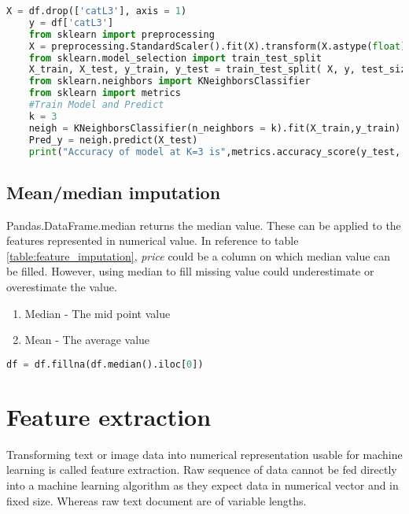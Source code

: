 \begin{lstlisting}[language=Python]
    X = df.drop(['catL3'], axis = 1)
    y = df['catL3']
    from sklearn import preprocessing
    X = preprocessing.StandardScaler().fit(X).transform(X.astype(float))
    from sklearn.model_selection import train_test_split
    X_train, X_test, y_train, y_test = train_test_split( X, y, test_size=0.2, random_state=4)
    from sklearn.neighbors import KNeighborsClassifier
    from sklearn import metrics
    #Train Model and Predict
    k = 3  
    neigh = KNeighborsClassifier(n_neighbors = k).fit(X_train,y_train)
    Pred_y = neigh.predict(X_test)
    print("Accuracy of model at K=3 is",metrics.accuracy_score(y_test, Pred_y))
\end{lstlisting}



\subsection{Mean/median imputation}

Pandas.DataFrame.median \parencite{mckinney-proc-scipy-2010} returns the median value. These can be applied to the features represented in numerical value. In reference to table \ref{table:feature_imputation}, \textit{price} could be a column on which median value can be filled. However, using median to fill missing value could underestimate or overestimate the value.

\begin{enumerate}
    \item Median - The mid point value
    \item Mean - The average value
\end{enumerate}

\begin{lstlisting}[language=Python]
    df = df.fillna(df.median().iloc[0])
\end{lstlisting}




\section{Feature extraction} \label{ch:feature-extraction}

Transforming text or image data into numerical representation usable for machine learning is called feature extraction. Raw sequence of data cannot be fed directly into a machine learning algorithm as they expect data in numerical vector and in fixed size. Whereas raw text document are of variable lengths. 

